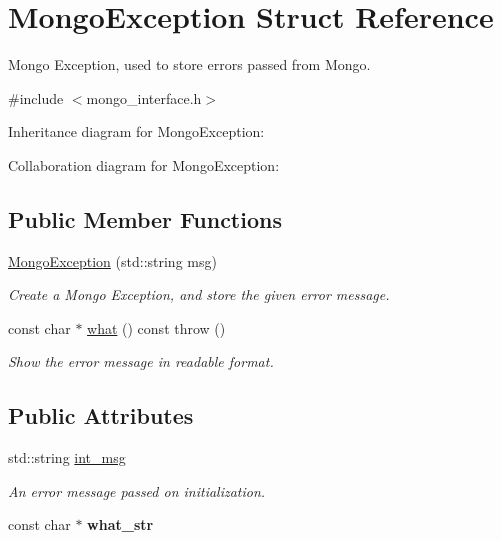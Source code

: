 \hypertarget{structMongoException}{}\section{Mongo\+Exception Struct Reference}
\label{structMongoException}


Mongo Exception, used to store errors passed from Mongo.  




{\ttfamily \#include $<$mongo\+\_\+interface.\+h$>$}



Inheritance diagram for Mongo\+Exception\+:


Collaboration diagram for Mongo\+Exception\+:
\subsection*{Public Member Functions}
\begin{DoxyCompactItemize}
\item 
\hyperlink{structMongoException_addaa545189ab30bcc6a0e957514253fa}{Mongo\+Exception} (std\+::string msg)\hypertarget{structMongoException_addaa545189ab30bcc6a0e957514253fa}{}\label{structMongoException_addaa545189ab30bcc6a0e957514253fa}

\begin{DoxyCompactList}\small\item\em Create a Mongo Exception, and store the given error message. \end{DoxyCompactList}\item 
const char $\ast$ \hyperlink{structMongoException_a5202b0dfc3d8a554d9f36e4b1c31c2a3}{what} () const   throw ()\hypertarget{structMongoException_a5202b0dfc3d8a554d9f36e4b1c31c2a3}{}\label{structMongoException_a5202b0dfc3d8a554d9f36e4b1c31c2a3}

\begin{DoxyCompactList}\small\item\em Show the error message in readable format. \end{DoxyCompactList}\end{DoxyCompactItemize}
\subsection*{Public Attributes}
\begin{DoxyCompactItemize}
\item 
std\+::string \hyperlink{structMongoException_ae5a0824b7a469b66dcc3947704310e4c}{int\+\_\+msg}\hypertarget{structMongoException_ae5a0824b7a469b66dcc3947704310e4c}{}\label{structMongoException_ae5a0824b7a469b66dcc3947704310e4c}

\begin{DoxyCompactList}\small\item\em An error message passed on initialization. \end{DoxyCompactList}\item 
const char $\ast$ {\bfseries what\+\_\+str}\hypertarget{structMongoException_a353b1718c8c33c8216cafcfeb596859f}{}\label{structMongoException_a353b1718c8c33c8216cafcfeb596859f}

\end{DoxyCompactItemize}


